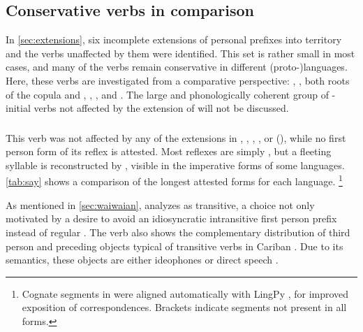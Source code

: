 \subsection{Conservative verbs in comparison}
\label{sec:verbs}
In \cref{sec:extensions}, six incomplete extensions of personal prefixes into  territory and the verbs unaffected by them were identified.
This set is rather small in most cases, and many of the verbs remain conservative in different (proto-)languages.
Here, these verbs are investigated from a comparative perspective:
  ,   , both roots of the copula  and  ,   ,    , and   .
The large and phonologically coherent group of -initial verbs not affected by the extension of \akuriyo {}  will not be discussed.

\subsubsection{ }
\label{sec:say}
This verb was not affected by any of the extensions in \PPek, \PWai, \PTir, \akuriyo, or \carijo (), while no first person form of its \yukpa reflex  is attested.
Most reflexes are simply , but a fleeting syllable  is reconstructed by \textcite{gildea2007greenberg}, visible in the imperative forms of some languages. %
%
%
\cref{tab:say} shows a comparison of the longest attested forms for each language.%
\footnote{Cognate segments in  were aligned automatically with LingPy \parencite{lingpy268}, for improved exposition of correspondences.
Brackets indicate segments not present in all forms.}
%
%
%


As mentioned in \cref{sec:waiwaian}, \textcite{hixkaryanaderby1985} analyzes \hixka {} as transitive, a choice not only motivated by a desire to avoid an idiosyncratic intransitive first person prefix  instead of regular .
The verb also shows the complementary distribution of third person  and preceding objects typical of transitive verbs in Cariban \parencite[60--81]{gildea1998}.
Due to its semantics, these objects are either ideophones or direct speech .

